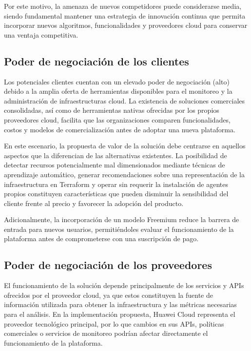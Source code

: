 Por este motivo, la amenaza de nuevos competidores puede considerarse media, siendo fundamental mantener una estrategia de innovación continua que permita incorporar nuevos algoritmos, funcionalidades y proveedores cloud para conservar una ventaja competitiva.

\subsection{Poder de negociación de los clientes}

Los potenciales clientes cuentan con un elevado poder de negociación (alto) debido a la amplia oferta de herramientas disponibles para el monitoreo y la administración de infraestructuras cloud. La existencia de soluciones comerciales consolidadas, así como de herramientas nativas ofrecidas por los propios proveedores cloud, facilita que las organizaciones comparen funcionalidades, costos y modelos de comercialización antes de adoptar una nueva plataforma.

En este escenario, la propuesta de valor de la solución debe centrarse en aquellos aspectos que la diferencian de las alternativas existentes. La posibilidad de detectar recursos potencialmente mal dimensionados mediante técnicas de aprendizaje automático, generar recomendaciones sobre una representación de la infraestructura en Terraform y operar sin requerir la instalación de agentes propios constituyen características que pueden disminuir la sensibilidad del cliente frente al precio y favorecer la adopción del producto.

Adicionalmente, la incorporación de un modelo Freemium reduce la barrera de entrada para nuevos usuarios, permitiéndoles evaluar el funcionamiento de la plataforma antes de comprometerse con una suscripción de pago.

\subsection{Poder de negociación de los proveedores}

El funcionamiento de la solución depende principalmente de los servicios y APIs ofrecidos por el proveedor cloud, ya que estos constituyen la fuente de información utilizada para obtener la infraestructura y las métricas necesarias para el análisis. En la implementación propuesta, Huawei Cloud representa el proveedor tecnológico principal, por lo que cambios en sus APIs, políticas comerciales o servicios de monitoreo podrían afectar directamente el funcionamiento de la plataforma.


